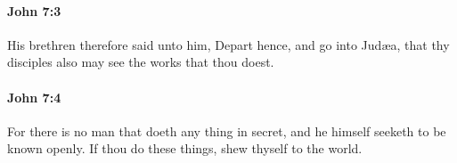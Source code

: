 		\paragraph{John 7:3} %
			\label{JOHN-7-3}

			His brethren therefore said unto him, Depart hence, and go into Judæa, that thy disciples also may see the works that thou doest.

			\begin{framed}
			\scriptsize
				\begin{compactdesc}
					\item[SBLG] 
				\end{compactdesc}
			\end{framed}

		\paragraph{John 7:4} %
			\label{JOHN-7-4}

			For there is no man that doeth any thing in secret, and he himself seeketh to be known openly. If thou do these things, shew thyself to the world.

